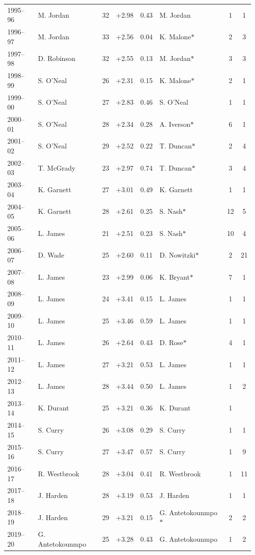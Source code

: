 \documentclass[11pt]{article}
\begin{document}
\begin{table}[p]
\begin{tabular}{llcccl cc}
1995--96 & M. Jordan & 32 & +2.98 & 0.43 & M. Jordan & 1 & 1 \\
1996--97 & M. Jordan & 33 & +2.56 & 0.04 & K. Malone$\ast$ & 2 & 3 \\
1997--98 & D. Robinson & 32 & +2.55 & 0.13 & M. Jordan$\ast$ & 3 & 3 \\
1998--99 & S. O'Neal & 26 & +2.31 & 0.15 & K. Malone$\ast$ & 2 & 1 \\
1999--00 & S. O'Neal & 27 & +2.83 & 0.46 & S. O'Neal & 1 & 1 \\
2000--01 & S. O'Neal & 28 & +2.34 & 0.28 & A. Iverson$\ast$ & 6 & 1 \\
2001--02 & S. O'Neal & 29 & +2.52 & 0.22 & T. Duncan$\ast$ & 2 & 4 \\
2002--03 & T. McGrady & 23 & +2.97 & 0.74 & T. Duncan$\ast$ & 3 & 4 \\
2003--04 & K. Garnett & 27 & +3.01 & 0.49 & K. Garnett & 1 & 1 \\
2004--05 & K. Garnett & 28 & +2.61 & 0.25 & S. Nash$\ast$ & 12 & 5 \\
2005--06 & L. James & 21 & +2.51 & 0.23 & S. Nash$\ast$ & 10 & 4 \\
2006--07 & D. Wade & 25 & +2.60 & 0.11 & D. Nowitzki$\ast$ & 2 & 21 \\
2007--08 & L. James & 23 & +2.99 & 0.06 & K. Bryant$\ast$ & 7 & 1 \\
2008--09 & L. James & 24 & +3.41 & 0.15 & L. James & 1 & 1 \\
2009--10 & L. James & 25 & +3.46 & 0.59 & L. James & 1 & 1 \\
2010--11 & L. James & 26 & +2.64 & 0.43 & D. Rose$\ast$ & 4 & 1 \\
2011--12 & L. James & 27 & +3.21 & 0.53 & L. James & 1 & 1 \\
2012--13 & L. James & 28 & +3.44 & 0.50 & L. James & 1 & 2 \\
2013--14 & K. Durant & 25 & +3.21 & 0.36 & K. Durant & 1 &  \\
2014--15 & S. Curry & 26 & +3.08 & 0.29 & S. Curry & 1 & 1 \\
2015--16 & S. Curry & 27 & +3.47 & 0.57 & S. Curry & 1 & 9 \\
2016--17 & R. Westbrook & 28 & +3.04 & 0.41 & R. Westbrook & 1 & 11 \\
2017--18 & J. Harden & 28 & +3.19 & 0.53 & J. Harden & 1 & 1 \\
2018--19 & J. Harden & 29 & +3.21 & 0.15 & G. Antetokounmpo$\ast$ & 2 & 2 \\
2019--20 & G. Antetokounmpo & 25 & +3.28 & 0.43 & G. Antetokounmpo & 1 & 2 \\

\end{tabular}
\end{table}
\end{document}
